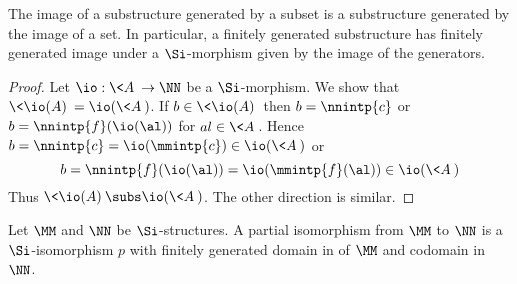 \begin{prop}
    The image of a substructure generated by a subset is a substructure 
    generated by the image of a set.
    In particular,
    a finitely generated substructure has finitely generated image under a 
    $\Si$-morphism given by the image of the generators.
\end{prop}
\begin{proof}
    Let $\io : \<A\> \to \NN$ be a $\Si$-morphism.
    We show that $\<\io(A)\> = \io(\<A\>)$.
    If $b \in \<\io(A)\>$ then $b = \nnintp{c}$ or $b = \nnintp{f}(\io(\al))$ 
    for $al \in \<A\>$.
    Hence $b = \nnintp{c} = \io(\mmintp{c}) \in \io(\<A\>)$
    or 
    \[b = \nnintp{f}(\io(\al)) = \io(\mmintp{f}(\al)) \in \io(\<A\>)\]
    Thus $\<\io(A)\> \subs \io(\<A\>)$.
    The other direction is similar.
\end{proof}

\begin{dfn}
    Let $\MM$ and $\NN$ be $\Si$-structures.
    A partial isomorphism from $\MM$ to $\NN$ is a $\Si$-isomorphism $p$
    with finitely generated domain in of $\MM$ 
    and codomain in $\NN$.
\end{dfn}

